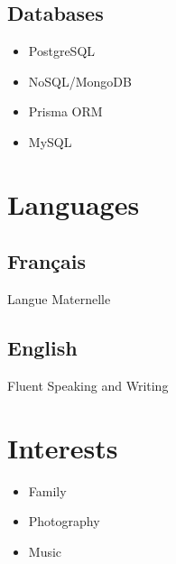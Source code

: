 \documentclass{article}
\begin{document}
\begin{paracol}{2}
\begin{leftcolumn}
    \subsection{Databases}
    \begin{itemize}
      \item PostgreSQL
      \item NoSQL/MongoDB
      \item Prisma ORM
      \item MySQL
    \end{itemize}

    \section{Languages}

    \subsection{Français}
    Langue Maternelle

    \vspace{0.5em}

    \subsection{English}
    Fluent Speaking and Writing

    \section{Interests}

    \begin{itemize}
      \item Family
      \item Photography
      \item Music
    \end{itemize}


  \end{leftcolumn}
  \begin{rightcolumn}


\end{rightcolumn}
\end{paracol}
\end{document}
